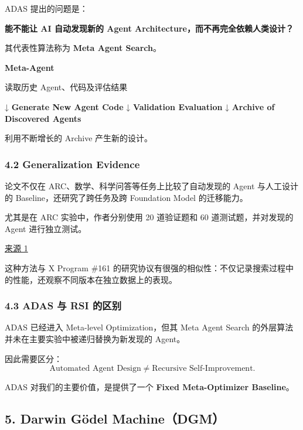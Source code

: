 ADAS 提出的问题是：

\textbf{能不能让 AI 自动发现新的 Agent Architecture，而不再完全依赖人类设计？}

其代表性算法称为 \textbf{Meta Agent Search}。

\textbf{Meta-Agent}

读取历史 Agent、代码及评估结果

↓ \textbf{Generate New Agent Code} ↓ \textbf{Validation Evaluation} ↓ \textbf{Archive of Discovered Agents}

利用不断增长的 Archive 产生新的设计。

\hypertarget{part-3-44-0001-generalization-evidence}{%
\subsubsection{4.2 Generalization Evidence}\label{part-3-44-0001-generalization-evidence}}

论文不仅在 ARC、数学、科学问答等任务上比较了自动发现的 Agent 与人工设计的 Baseline，还研究了跨任务及跨 Foundation Model 的迁移能力。

尤其是在 ARC 实验中，作者分别使用 20 道验证题和 60 道测试题，并对发现的 Agent 进行独立测试。

\href{https://arxiv.org/html/2408.08435}{来源 1}

这种方法与 X Program \#161 的研究协议有很强的相似性：不仅记录搜索过程中的性能，还观察不同版本在独立数据上的表现。

\hypertarget{part-3-44-0001-adas-ux4e0e-rsi-ux7684ux533aux522b}{%
\subsubsection{4.3 ADAS 与 RSI 的区别}\label{part-3-44-0001-adas-ux4e0e-rsi-ux7684ux533aux522b}}

ADAS 已经进入 Meta-level Optimization，但其 Meta Agent Search 的外层算法并未在主要实验中被递归替换为新发现的 Agent。

因此需要区分：
\[\text{Automated Agent Design}
\neq
\text{Recursive Self-Improvement}.\]

ADAS 对我们的主要价值，是提供了一个 \textbf{Fixed Meta-Optimizer Baseline}。

\hypertarget{part-3-44-0001-darwin-guxf6del-machinedgm}{%
\subsection{5. Darwin Gödel Machine（DGM）}\label{part-3-44-0001-darwin-guxf6del-machinedgm}}

